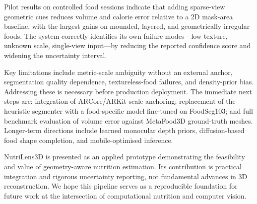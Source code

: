 \documentclass[conference]{IEEEtran}
\begin{document}
Pilot results on controlled food sessions indicate that adding sparse-view
geometric cues reduces volume and calorie error relative to a 2D mask-area
baseline, with the largest gains on mounded, layered, and geometrically
irregular foods. The system
correctly identifies its own failure modes---low texture, unknown scale,
single-view input---by reducing the reported confidence score and widening the
uncertainty interval.

Key limitations include metric-scale ambiguity without an external anchor,
segmentation quality dependence, textureless-food failures, and density-prior
bias. Addressing these is necessary before production deployment. The immediate
next steps are: integration of ARCore/ARKit scale anchoring; replacement of the
heuristic segmenter with a food-specific model fine-tuned on FoodSeg103; and
full benchmark evaluation of volume error against MetaFood3D ground-truth
meshes. Longer-term directions include learned monocular depth priors,
diffusion-based food shape completion, and mobile-optimised inference.

NutriLens3D is presented as an applied prototype demonstrating the feasibility
and value of geometry-aware nutrition estimation. Its contribution is practical
integration and rigorous uncertainty reporting, not fundamental advances in
3D reconstruction. We hope this pipeline serves as a reproducible foundation
for future work at the intersection of computational nutrition and computer vision.
\end{document}
